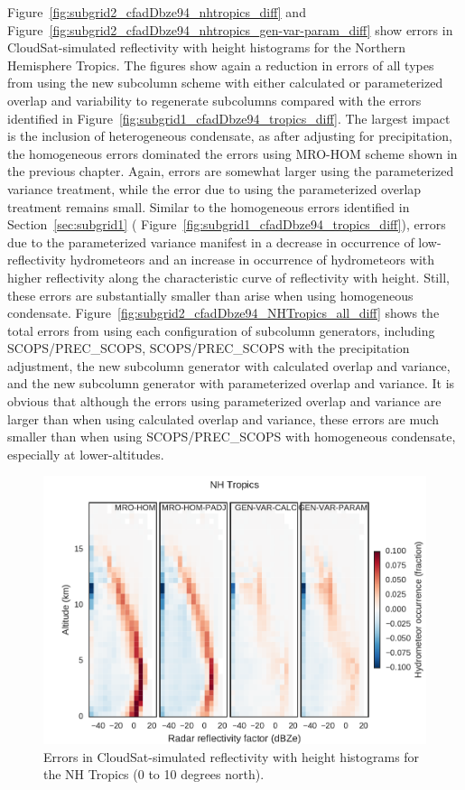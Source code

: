 Figure~\ref{fig:subgrid2_cfadDbze94_nhtropics_diff} and
Figure~\ref{fig:subgrid2_cfadDbze94_nhtropics_gen-var-param_diff} show
errors in CloudSat-simulated reflectivity with height histograms for the
Northern Hemisphere Tropics. The figures show again a reduction in
errors of all types from using the new subcolumn scheme with either
calculated or parameterized overlap and variability to regenerate
subcolumns compared with the errors identified in
Figure~\ref{fig:subgrid1_cfadDbze94_tropics_diff}. The largest impact is
the inclusion of heterogeneous condensate, as after adjusting for
precipitation, the homogeneous errors dominated the errors using MRO-HOM
scheme shown in the previous chapter. Again, errors are somewhat larger
using the parameterized variance treatment, while the error due to using
the parameterized overlap treatment remains small. Similar to the
homogeneous errors identified in Section~\ref{sec:subgrid1} (
Figure~\ref{fig:subgrid1_cfadDbze94_tropics_diff}), errors due to the
parameterized variance manifest in a decrease in occurrence of
low-reflectivity hydrometeors and an increase in occurrence of
hydrometeors with higher reflectivity along the characteristic curve of
reflectivity with height. Still, these errors are substantially smaller
than arise when using homogeneous condensate.
Figure~\ref{fig:subgrid2_cfadDbze94_NHTropics_all_diff} shows the total
errors from using each configuration of subcolumn generators, including
SCOPS/PREC\_SCOPS, SCOPS/PREC\_SCOPS with the precipitation adjustment,
the new subcolumn generator with calculated overlap and variance, and
the new subcolumn generator with parameterized overlap and variance. It
is obvious that although the errors using parameterized overlap and
variance are larger than when using calculated overlap and variance,
these errors are much smaller than when using SCOPS/PREC\_SCOPS with
homogeneous condensate, especially at lower-altitudes.

\begin{figure}[htbp]
\centering
\includegraphics{graphics/subgrid2_cfadDbze94_NHTropics_all_diff.pdf}
\caption{\label{fig:subgrid2_cfadDbze94_NHTropics_all_diff}Errors in
CloudSat-simulated reflectivity with height histograms for the NH
Tropics (0 to 10 degrees
north).}\label{fig:subgrid2ux5fcfadDbze94ux5fNHTropicsux5fallux5fdiff}
\end{figure}

